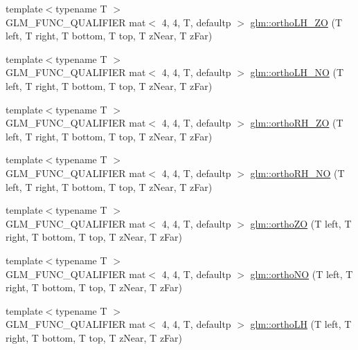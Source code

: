 \begin{DoxyCompactItemize}
\item 
{\footnotesize template$<$typename T $>$ }\\G\+L\+M\+\_\+\+F\+U\+N\+C\+\_\+\+Q\+U\+A\+L\+I\+F\+I\+ER mat$<$ 4, 4, T, defaultp $>$ \hyperlink{group__gtc__matrix__transform_gab37ac3eec8d61f22fceda7775e836afa}{glm\+::ortho\+L\+H\+\_\+\+ZO} (T left, T right, T bottom, T top, T z\+Near, T z\+Far)
\item 
{\footnotesize template$<$typename T $>$ }\\G\+L\+M\+\_\+\+F\+U\+N\+C\+\_\+\+Q\+U\+A\+L\+I\+F\+I\+ER mat$<$ 4, 4, T, defaultp $>$ \hyperlink{group__gtc__matrix__transform_ga526416735ea7c5c5cd255bf99d051bd8}{glm\+::ortho\+L\+H\+\_\+\+NO} (T left, T right, T bottom, T top, T z\+Near, T z\+Far)
\item 
{\footnotesize template$<$typename T $>$ }\\G\+L\+M\+\_\+\+F\+U\+N\+C\+\_\+\+Q\+U\+A\+L\+I\+F\+I\+ER mat$<$ 4, 4, T, defaultp $>$ \hyperlink{group__gtc__matrix__transform_ga9aea2e515b08fd7dce47b7b6ec34d588}{glm\+::ortho\+R\+H\+\_\+\+ZO} (T left, T right, T bottom, T top, T z\+Near, T z\+Far)
\item 
{\footnotesize template$<$typename T $>$ }\\G\+L\+M\+\_\+\+F\+U\+N\+C\+\_\+\+Q\+U\+A\+L\+I\+F\+I\+ER mat$<$ 4, 4, T, defaultp $>$ \hyperlink{group__gtc__matrix__transform_gaa2f7a1373170bf0a4a2ddef9b0706780}{glm\+::ortho\+R\+H\+\_\+\+NO} (T left, T right, T bottom, T top, T z\+Near, T z\+Far)
\item 
{\footnotesize template$<$typename T $>$ }\\G\+L\+M\+\_\+\+F\+U\+N\+C\+\_\+\+Q\+U\+A\+L\+I\+F\+I\+ER mat$<$ 4, 4, T, defaultp $>$ \hyperlink{group__gtc__matrix__transform_gaea11a70817af2c0801c869dea0b7a5bc}{glm\+::ortho\+ZO} (T left, T right, T bottom, T top, T z\+Near, T z\+Far)
\item 
{\footnotesize template$<$typename T $>$ }\\G\+L\+M\+\_\+\+F\+U\+N\+C\+\_\+\+Q\+U\+A\+L\+I\+F\+I\+ER mat$<$ 4, 4, T, defaultp $>$ \hyperlink{group__gtc__matrix__transform_gab219d28a8f178d4517448fcd6395a073}{glm\+::ortho\+NO} (T left, T right, T bottom, T top, T z\+Near, T z\+Far)
\item 
{\footnotesize template$<$typename T $>$ }\\G\+L\+M\+\_\+\+F\+U\+N\+C\+\_\+\+Q\+U\+A\+L\+I\+F\+I\+ER mat$<$ 4, 4, T, defaultp $>$ \hyperlink{group__gtc__matrix__transform_gad122a79aadaa5529cec4ac197203db7f}{glm\+::ortho\+LH} (T left, T right, T bottom, T top, T z\+Near, T z\+Far)

\end{DoxyCompactItemize}
